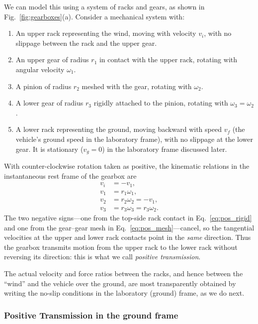 \documentclass[reprint,aps,pra,longbibliography]{revtex4-2}
\begin{document}
We can model this using a system of racks and gears, as shown in Fig.~\ref{fig:gearboxes}(a). Consider a mechanical system with:
\begin{enumerate}
\item An upper rack representing the wind, moving with velocity $v_i$, with no slippage between the rack and the upper gear.
\item An upper gear of radius $r_1$ in contact with the upper rack, rotating with angular velocity $\omega_1$.
\item A pinion of radius $r_2$ meshed with the gear, rotating with $\omega_2$.
\item A lower gear of radius $r_3$ rigidly attached to the pinion, rotating with $\omega_3 = \omega_2$.
\item A lower rack representing the ground, moving backward with speed $v_f$ (the vehicle's ground speed in the laboratory frame), with no slippage at the lower gear. It is stationary ($v_g = 0$) in the laboratory frame discussed later.
\end{enumerate}

With counter-clockwise rotation taken as positive, the kinematic relations in
the instantaneous rest frame of the gearbox are
\begin{align}
v_i &= -v_1,  \label{eq:pos_rigid}\\
v_1 &= r_1 \omega_1,\\
v_2 &= r_2 \omega_2 = -v_1, \label{eq:pos_mesh}\\
v_3 &= r_3 \omega_3 = r_3 \omega_2.
\end{align}
The two negative signs---one from the top-side rack contact in
Eq.~\eqref{eq:pos_rigid} and one from the gear--gear mesh in
Eq.~\eqref{eq:pos_mesh}---cancel, so the tangential velocities at the upper and
lower rack contacts point in the \emph{same} direction. Thus the gearbox
transmits motion from the upper rack to the lower rack without reversing its
direction: this is what we call \emph{positive transmission}.

The actual velocity and force ratios between the racks, and hence between the
``wind'' and the vehicle over the ground, are most transparently obtained by
writing the no-slip conditions in the laboratory (ground) frame, as we do next.

\subsubsection{Positive Transmission in the ground frame}
\end{document}

